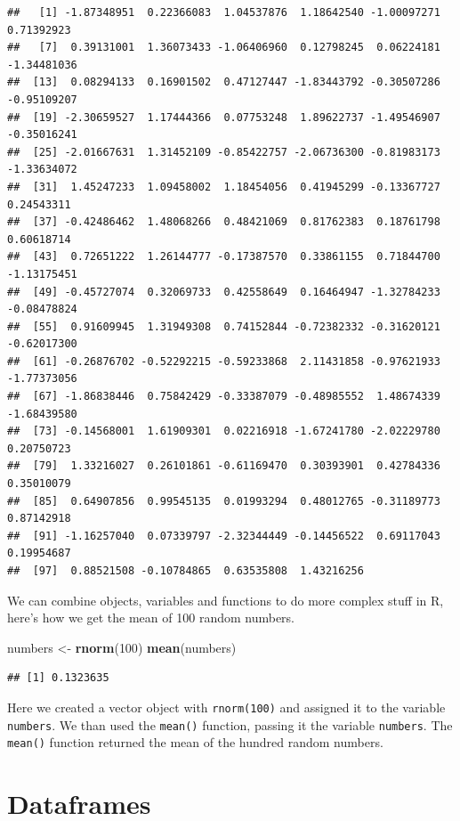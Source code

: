 \documentclass[
]{book}
\newenvironment{Shaded}{\begin{snugshade}}{\end{snugshade}}
\newcommand{\DecValTok}[1]{\textcolor[rgb]{0.00,0.00,0.81}{#1}}
\newcommand{\KeywordTok}[1]{\textcolor[rgb]{0.13,0.29,0.53}{\textbf{#1}}}
\newcommand{\NormalTok}[1]{#1}
\newcommand{\StringTok}[1]{\textcolor[rgb]{0.31,0.60,0.02}{#1}}
\begin{document}
\begin{verbatim}
##   [1] -1.87348951  0.22366083  1.04537876  1.18642540 -1.00097271  0.71392923
##   [7]  0.39131001  1.36073433 -1.06406960  0.12798245  0.06224181 -1.34481036
##  [13]  0.08294133  0.16901502  0.47127447 -1.83443792 -0.30507286 -0.95109207
##  [19] -2.30659527  1.17444366  0.07753248  1.89622737 -1.49546907 -0.35016241
##  [25] -2.01667631  1.31452109 -0.85422757 -2.06736300 -0.81983173 -1.33634072
##  [31]  1.45247233  1.09458002  1.18454056  0.41945299 -0.13367727  0.24543311
##  [37] -0.42486462  1.48068266  0.48421069  0.81762383  0.18761798  0.60618714
##  [43]  0.72651222  1.26144777 -0.17387570  0.33861155  0.71844700 -1.13175451
##  [49] -0.45727074  0.32069733  0.42558649  0.16464947 -1.32784233 -0.08478824
##  [55]  0.91609945  1.31949308  0.74152844 -0.72382332 -0.31620121 -0.62017300
##  [61] -0.26876702 -0.52292215 -0.59233868  2.11431858 -0.97621933 -1.77373056
##  [67] -1.86838446  0.75842429 -0.33387079 -0.48985552  1.48674339 -1.68439580
##  [73] -0.14568001  1.61909301  0.02216918 -1.67241780 -2.02229780  0.20750723
##  [79]  1.33216027  0.26101861 -0.61169470  0.30393901  0.42784336  0.35010079
##  [85]  0.64907856  0.99545135  0.01993294  0.48012765 -0.31189773  0.87142918
##  [91] -1.16257040  0.07339797 -2.32344449 -0.14456522  0.69117043  0.19954687
##  [97]  0.88521508 -0.10784865  0.63535808  1.43216256
\end{verbatim}

We can combine objects, variables and functions to do more complex stuff in R, here's how we get the mean of 100 random numbers.

\begin{Shaded}
\begin{Highlighting}[]
\NormalTok{numbers <-}\StringTok{ }\KeywordTok{rnorm}\NormalTok{(}\DecValTok{100}\NormalTok{)}
\KeywordTok{mean}\NormalTok{(numbers)}
\end{Highlighting}
\end{Shaded}

\begin{verbatim}
## [1] 0.1323635
\end{verbatim}

Here we created a vector object with \texttt{rnorm(100)} and assigned it to the variable \texttt{numbers}. We than used the \texttt{mean()} function, passing it the variable \texttt{numbers}. The \texttt{mean()} function returned the mean of the hundred random numbers.

\hypertarget{dataframes}{%
\section{Dataframes}\label{dataframes}}
\end{document}
